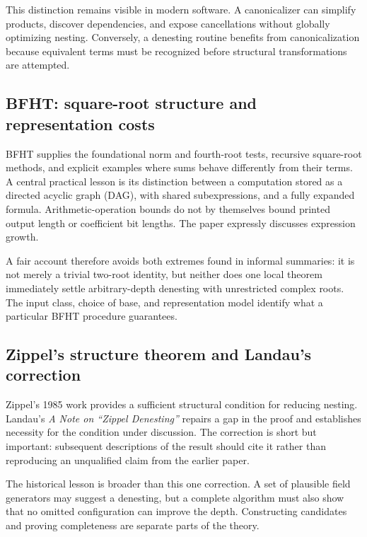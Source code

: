 \documentclass[11pt,a4paper]{article}
\theoremstyle{definition}
\theoremstyle{remark}
\numberwithin{equation}{section}
\begin{document}
This distinction remains visible in modern software. A canonicalizer can simplify products, discover dependencies, and expose cancellations without globally optimizing nesting. Conversely, a denesting routine benefits from canonicalization because equivalent terms must be recognized before structural transformations are attempted.

\subsection{BFHT: square-root structure and representation costs}

BFHT supplies the foundational norm and fourth-root tests, recursive square-root methods, and explicit examples where sums behave differently from their terms. A central practical lesson is its distinction between a computation stored as a directed acyclic graph (DAG), with shared subexpressions, and a fully expanded formula. Arithmetic-operation bounds do not by themselves bound printed output length or coefficient bit lengths. The paper expressly discusses expression growth.\cite{bfht}

A fair account therefore avoids both extremes found in informal summaries: it is not merely a trivial two-root identity, but neither does one local theorem immediately settle arbitrary-depth denesting with unrestricted complex roots. The input class, choice of base, and representation model identify what a particular BFHT procedure guarantees.

\subsection{Zippel's structure theorem and Landau's correction}

Zippel's 1985 work provides a sufficient structural condition for reducing nesting. Landau's \emph{A Note on ``Zippel Denesting''} repairs a gap in the proof and establishes necessity for the condition under discussion. The correction is short but important: subsequent descriptions of the result should cite it rather than reproducing an unqualified claim from the earlier paper.\cite{zippel,landaunote}

The historical lesson is broader than this one correction. A set of plausible field generators may suggest a denesting, but a complete algorithm must also show that no omitted configuration can improve the depth. Constructing candidates and proving completeness are separate parts of the theory.
\end{document}
